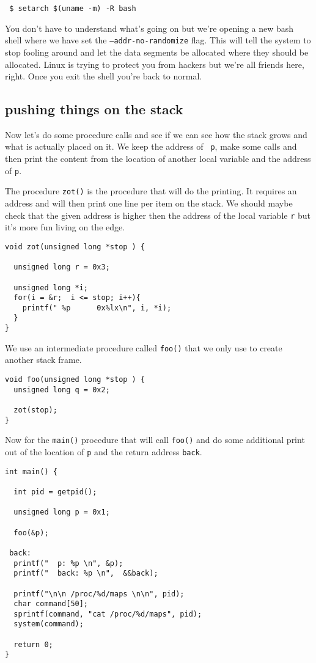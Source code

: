 \documentclass[a4paper,11pt]{article}
\begin{document}
\begin{verbatim}
 $ setarch $(uname -m) -R bash
\end{verbatim}

You don't have to understand what's going on but we're opening a new
bash shell where we have set the {\tt --addr-no-randomize} flag.  This
will tell the system to stop fooling around and let the data segments
be allocated where they should be allocated. Linux is trying to
protect you from hackers but we're all friends here, right. Once you
exit the shell you're back to normal.

\subsection{pushing things on the stack}

Now let's do some procedure calls and see if we can see how the stack
grows and what is actually placed on it. We keep the address of {\tt
  p}, make some calls and then print the content from the location of 
another local variable and the address of {\tt p}.

The procedure {\tt zot()} is the procedure that will do the
printing. It requires an address and will then print one line per item
on the stack. We should maybe check that the given address is higher
then the address of the local variable {\tt r} but it's more fun
living on the edge.

\begin{lstlisting}
void zot(unsigned long *stop ) {

  unsigned long r = 0x3;
  
  unsigned long *i;
  for(i = &r;  i <= stop; i++){
    printf(" %p      0x%lx\n", i, *i);
  }
}
\end{lstlisting}

We use an intermediate procedure called {\tt foo()} that we only use
to create another stack frame.

\begin{lstlisting}
void foo(unsigned long *stop ) {
  unsigned long q = 0x2;

  zot(stop);
}
\end{lstlisting}

Now for the {\tt main()} procedure that will call {\tt foo()} and do
some additional print out of the location of {\tt p} and the return
address {\tt back}.

\begin{lstlisting}
int main() {

  int pid = getpid();
  
  unsigned long p = 0x1;

  foo(&p);

 back:
  printf("  p: %p \n", &p);
  printf("  back: %p \n",  &&back);

  printf("\n\n /proc/%d/maps \n\n", pid);
  char command[50];
  sprintf(command, "cat /proc/%d/maps", pid);
  system(command);  

  return 0;
}
\end{lstlisting}
\end{document}
